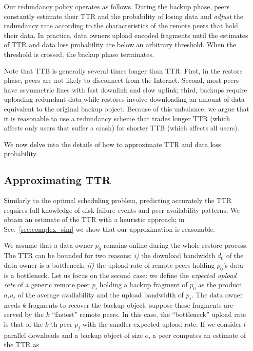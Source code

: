\documentclass[conference,10pt]{IEEEtran}
\begin{document}
Our redundancy policy operates as follows. During the backup phase, peers constantly estimate their TTR and the probability of losing data and \emph{adjust} the redundancy rate according to the characteristics of the remote peers that hold their data. In practice, data owners upload encoded fragments until the estimates of TTR and data loss probability are below an arbitrary threshold. When the threshold is crossed, the backup phase terminates.

Note that TTB is generally several times longer than TTR. First, in the restore phase, peers are not likely to disconnect from the Internet. Second, most peers have asymmetric lines with fast downlink and slow uplink; third, backups require uploading redundant data while restores involve downloading an amount of data equivalent to the original backup object. Because of this unbalance, we argue that it is reasonable to use a redundancy scheme that trades longer TTR (which affects only users that suffer a crash) for shorter TTB (which affects all users).

We now delve into the details of how to approximate TTR and data loss probability.

\subsection{Approximating TTR}

Similarly to the optimal scheduling problem, predicting accurately the TTR requires full knowledge of disk failure events and peer availability patterns. We obtain an estimate of the TTR with a heuristic approach; in Sec.~\ref{sec:complex_sim} we show that our approximation is reasonable.

We assume that a data owner $p_0$ remains online during the whole restore process. The TTR can be bounded for two reasons: \emph{i)} the download bandwidth $d_0$ of the data owner is a bottleneck; \emph{ii)} the upload rate of remote peers holding $p_0$'s data is a bottleneck.
Let us focus on the second case: we define the \emph{expected upload rate} of a generic remote peer $p_i$ holding a backup fragment of $p_0$ as the product $a_i u_i$ of the average availability and the upload bandwidth of $p_i$. 
The data owner needs $k$ fragments to recover the backup object: suppose these fragments are served by the $k$ ``fastest'' remote peers. In this case, the ``bottleneck'' upload rate is that of the $k$-th peer $p_j$ with the smaller expected upload rate.
If we consider $l$ parallel downloads and a backup object of size $o$, a peer computes an estimate of the TTR as
\end{document}
